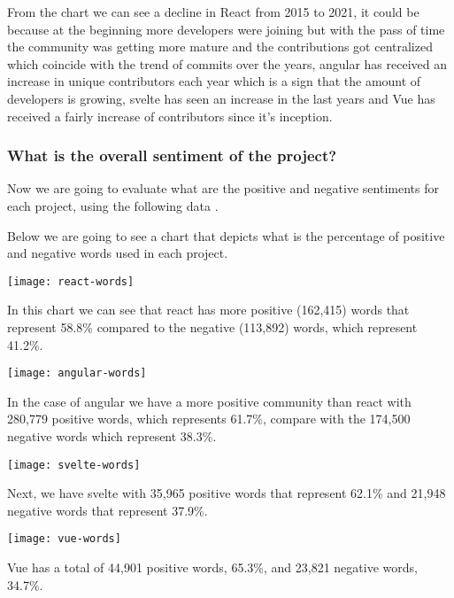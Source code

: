 From the chart we can see a decline in React from 2015 to 2021, it could be because at the beginning more developers were joining but with the pass of time the community was getting more mature and the contributions got centralized which coincide with the trend of commits over the years, angular has received an increase in unique contributors each year which is a sign that the amount of developers is growing, svelte has seen an increase in the last years and Vue has received a fairly increase of contributors since it's inception.

\subsubsection{What is the overall sentiment of the project?}
Now we are going to evaluate what are the positive and negative sentiments for each project, using the following data \cite{overall-sentiment}.

Below we are going to see a chart that depicts what is the percentage of positive and negative words used in each project.

\begin{center}
    \texttt{[image: react-words]}    
\end{center}

In this chart we can see that react has more positive (162,415) words that represent 58.8\% compared to the negative (113,892) words, which represent 41.2\%.

\begin{center}
    \texttt{[image: angular-words]}    
\end{center}

In the case of angular we have a more positive community than react with 280,779 positive words, which represents 61.7\%, compare with the 174,500 negative words which represent 38.3\%.

\begin{center}
    \texttt{[image: svelte-words]}    
\end{center}

Next, we have svelte with 35,965 positive words that represent 62.1\% and 21,948 negative words that represent 37.9\%.

\begin{center}
    \texttt{[image: vue-words]}    
\end{center}

Vue has a total of 44,901 positive words, 65.3\%, and 23,821 negative words, 34.7\%.

